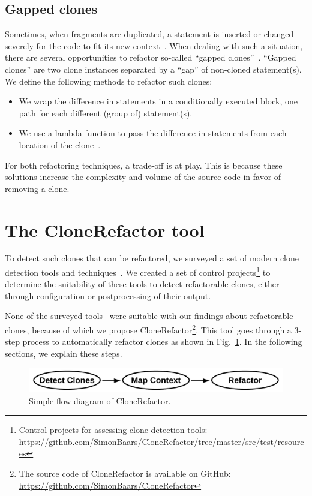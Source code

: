 \documentclass[conference]{IEEEtran}
\begin{document}
\subsection{Gapped clones} \label{sec:t3r}
Sometimes, when fragments are duplicated, a statement is inserted or changed severely for the code to fit its new context~\cite{roy2007survey}. When dealing with such a situation, there are several opportunities to refactor so-called ``gapped clones''~\cite{ueda2002detection, zhao2018automatic}. ``Gapped clones'' are two clone instances separated by a ``gap'' of non-cloned statement(s). We define the following methods to refactor such clones:
\begin{itemize}
  \item We wrap the difference in statements in a conditionally executed block, one path for each different (group of) statement(s).
  \item We use a lambda function to pass the difference in statements from each location of the clone~\cite{tsantalis2017clone}.
\end{itemize}
For both refactoring techniques, a trade-off is at play. This is because these solutions increase the complexity and volume of the source code in favor of removing a clone.

\section{The CloneRefactor tool}
To detect such clones that can be refactored, we surveyed a set of modern clone detection tools and techniques~\cite{svajlenko2014evaluating, sheneamer2016survey, gautam2016various, roy2009comparison}. We created a set of control projects\footnote{Control projects for assessing clone detection tools: \url{https://github.com/SimonBaars/CloneRefactor/tree/master/src/test/resources}} to determine the suitability of these tools to detect refactorable clones, either through configuration or postprocessing of their output.

None of the surveyed tools~\cite{ragkhitwetsagul2019siamese, roy2008nicad, semura2017ccfindersw, sajnani2016sourcerercc, saini2018oreo, jiang2007deckard, kamalpriya2017enhancing, mazinanian2016jdeodorant} were suitable with our findings about refactorable clones, because of which we propose CloneRefactor\footnote{The source code of CloneRefactor is available on GitHub: \url{https://github.com/SimonBaars/CloneRefactor}}. This tool goes through a 3-step process to automatically refactor clones as shown in Fig.~\ref{fig:clonerefactorflow}. In the following sections, we explain these steps.
\begin{figure}[H]
  \includegraphics[width=1\columnwidth]{img/flow}
  \caption{Simple flow diagram of CloneRefactor.}
  \label{fig:clonerefactorflow}
\end{figure}
\end{document}
